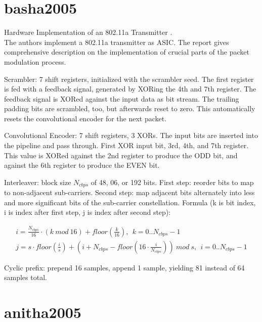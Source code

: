 
\section*{basha2005}

Hardware Implementation of an 802.11a Transmitter \cite{basha2005}.\\

The authors implement a 802.11a transmitter as ASIC. The report gives comprehensive description on the implementation of crucial parts of the packet modulation process.

Scrambler: 7 shift registers, initialized with the scrambler seed. The first register is fed with a feedback signal, generated by XORing the 4th and 7th register. The feedback signal is XORed against the input data as bit stream. The trailing padding bits are scrambled, too, but afterwards reset to zero. This automatically resets the convolutional encoder for the next packet.

Convolutional Encoder: 7 shift registers, 3 XORs. The input bits are inserted into the pipeline and pass through. First XOR input bit, 3rd, 4th, and 7th register. This value is XORed against the 2nd register to produce the ODD bit, and against the 6th register to produce the EVEN bit.

Interleaver: block size $N_{cbps}$ of 48, 06, or 192 bits. First step: reorder bits to map to non-adjacent sub-carriers. Second step: map adjacent bits alternately into less and more significant bits of the sub-carrier constellation. Formula (k is bit index, i is index after first step, j is index after second step):

\begin{align}
  i = \frac{N_{cbps}}{16} \cdot (k ~mod ~16) + floor(\frac{k}{16}), ~~k = 0 .. N_{cbps} - 1 \\
  j = s \cdot floor(\frac{i}{s}) + (i + N_{cbps} - floor(16 \cdot \frac{i}{N_{cbps}})) ~mod ~s, ~~i = 0 .. N_{cbps} - 1  \label{eqn:interleaving}
\end{align}

Cyclic prefix: prepend 16 samples, append 1 sample, yielding 81 instead of 64 samples total.



\section*{anitha2005}

